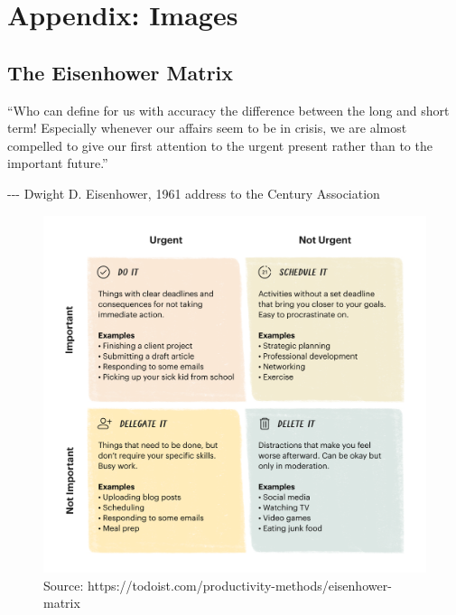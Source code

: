 \documentclass[
]{report}
\begin{document}
\hypertarget{appendix-images}{%
\chapter{Appendix: Images}\label{appendix-images}}

\hypertarget{sec-eisenhower}{%
\section{The Eisenhower Matrix}\label{sec-eisenhower}}

``Who can define for us with accuracy the difference between the long
and short term! Especially whenever our affairs seem to be in crisis, we
are almost compelled to give our first attention to the urgent present
rather than to the important future.''

-\/-\/- Dwight D. Eisenhower, 1961 address to the Century Association

\begin{figure}

{\centering \includegraphics[width=5.36in,height=\textheight]{images/eisenhower-matrix.png}

}

\caption{Source:
https://todoist.com/productivity-methods/eisenhower-matrix}

\end{figure}

\newpage{}
\end{document}
